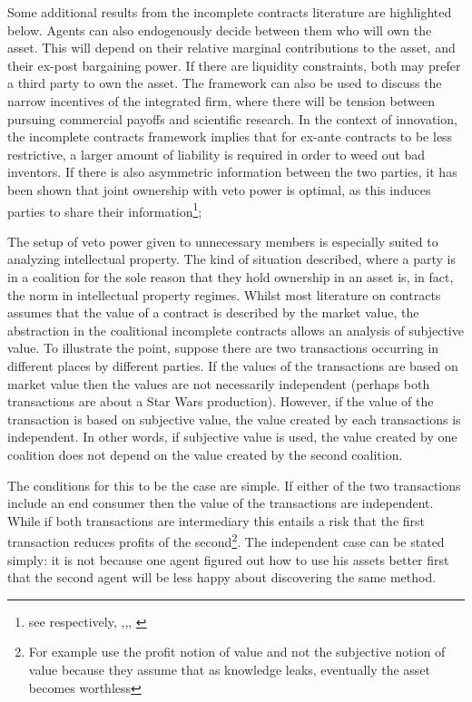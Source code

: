 Some additional results from the incomplete contracts literature are highlighted below. Agents can also endogenously decide between them who will own the asset. This will depend on their relative marginal contributions to the asset, and their ex-post bargaining power. If there are liquidity constraints, both may prefer a third party to own the asset. The framework can also be used to discuss the narrow incentives of the integrated firm, where there will be tension between pursuing commercial payoffs and scientific research. In the context of innovation, the incomplete contracts framework implies that for ex-ante contracts to be less restrictive, a larger amount of liability is required in order to weed out bad inventors. If there is also asymmetric information between the two parties, it has been shown that joint ownership with veto power is optimal, as this induces parties to share their information\footnote{see respectively, \cite{Aghion1994},\citep{lerner2010contractibility},\citep{anton1994expropriation}, \citep{Rosenkranz1999}};

The setup of veto power given to unnecessary members is especially suited to analyzing intellectual property. The kind of situation described, where a party is in a coalition for the sole reason that they hold ownership in an asset is, in fact, the norm in intellectual property regimes. Whilst most literature on contracts assumes that the value of a contract is described by the market value, the abstraction in the coalitional incomplete contracts allows an analysis of subjective value. To illustrate the point, suppose there are two transactions occurring in different places by different parties. If the values of the transactions are based on market value then the values are not necessarily independent (perhaps both transactions are about a Star Wars production). However, if the value of the transaction is based on subjective value, the value created by each transactions is independent. In other words, if subjective value is used, the value created by one coalition does not depend on the value created by the second coalition. 

The conditions for this to be the case are simple. If either of the two transactions include an end consumer then the value of the transactions are independent. While if both transactions are intermediary this entails a risk that the first transaction reduces profits of the second\footnote{ For example \cite{anton1994expropriation} use the profit notion of value and not the subjective notion of value because they assume that as knowledge leaks, eventually the asset becomes worthless}. The independent case can be stated simply: it is not because one agent figured out how to use his assets better first that the second agent will be less happy about discovering the same method. 

